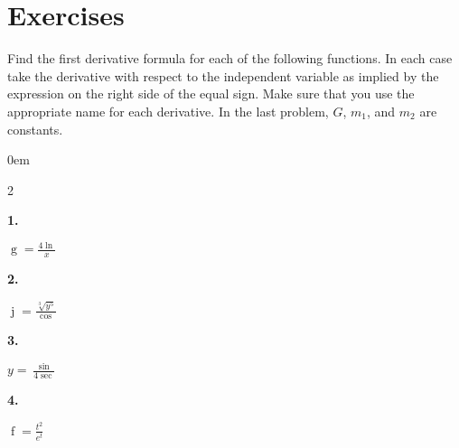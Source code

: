 \documentclass[12pt,]{book}
\theoremstyle{plain}
\theoremstyle{definition}
\numberwithin{equation}{section}
\newenvironment{exercisegroup}%
{\medskip\noindent}%
{\par\bigskip}%
\newlength{\exercisegroupindent}%
\newlength{\exercisegroupitemwidth}%
\newenvironment{exercisegrouplist}%
{\vspace{-\partopsep}%
\begin{adjustwidth}{\exercisegroupindent}{0em}}%
{\end{adjustwidth}%
\vspace{-\partopsep}%
\vspace{\baselineskip}}%
\newenvironment{exercisegroupbycol}[1]%
{\begin{exercisegrouplist}%
\vspace{-\multicolsep}%
\begin{multicols}{#1}%
\setlength{\parindent}{0em}%
\setlength{\exercisegroupitemwidth}{\linewidth}}%
{\end{multicols}%
\vspace{-\multicolsep}%
\end{exercisegrouplist}}%
\newenvironment{exercisegroupitem}[1]%
{\begin{minipage}[t]{\exercisegroupitemwidth}
\vspace{0pt}%
{\bfseries#1}%
\rule{0pt}{\baselineskip}}{\strut%
\end{minipage}%
\hspace{\columnsep}}%
\providecommand\phantomsection{}
\newcommand{\fe}[2]{\mathop{{#1}{\left(#2\right)}}}
\begin{document}
\section*{Exercises}\label{exercises-36}

\begin{exercisegroup}%
Find the first derivative formula for each of the following functions.  In each case take the derivative with respect to the independent variable as implied by the expression on the right side of the equal sign.  Make sure that you use the appropriate name for each derivative. In the last problem, \(G\), \(m_1\), and \(m_2\) are constants.%
\par
\begin{exercisegroupbycol}{2}%
\begin{exercisegroupitem}{1. }\phantomsection\hypertarget{exercise-314}{\null}
\(\fe{g}{x}=\frac{4\fe{\ln}{x}}{x}\)%
\end{exercisegroupitem}%
\par%
\begin{exercisegroupitem}{2. }\phantomsection\hypertarget{exercise-315}{\null}
\(\fe{j}{y}=\frac{\sqrt[3]{y^5}}{\fe{\cos}{y}}\)%
\end{exercisegroupitem}%
\par%
\begin{exercisegroupitem}{3. }\phantomsection\hypertarget{exercise-316}{\null}
\(y=\frac{\fe{\sin}{x}}{4\fe{\sec}{x}}\)%
\end{exercisegroupitem}%
\par%
\begin{exercisegroupitem}{4. }\phantomsection\hypertarget{exercise-317}{\null}
\(\fe{f}{t}=\frac{t^2}{e^t}\)%
\end{exercisegroupitem}%
\par%
\end{exercisegroupbycol}%
\end{exercisegroup}%
\end{document}

